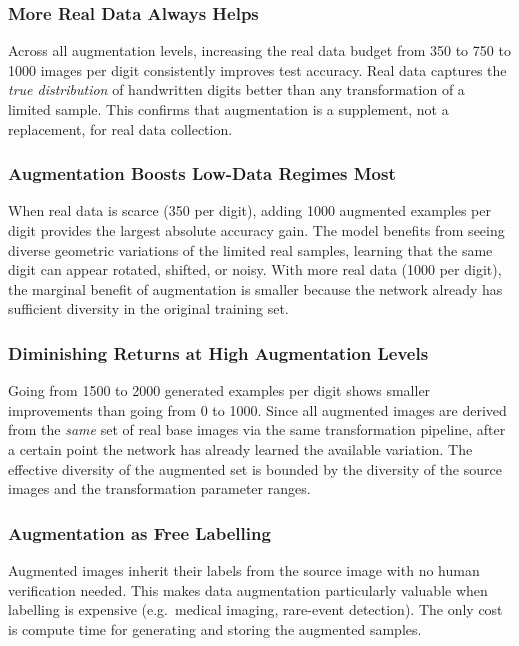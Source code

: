 \documentclass[12pt, a4paper]{article}
\begin{document}
\subsubsection{More Real Data Always Helps}

Across all augmentation levels, increasing the real data budget from 350 to 750 to
1000 images per digit consistently improves test accuracy. Real data captures the
\emph{true distribution} of handwritten digits better than any transformation of a
limited sample. This confirms that augmentation is a supplement, not a replacement,
for real data collection.

\subsubsection{Augmentation Boosts Low-Data Regimes Most}

When real data is scarce (350 per digit), adding 1000 augmented examples per digit
provides the largest absolute accuracy gain. The model benefits from seeing diverse
geometric variations of the limited real samples, learning that the same digit can
appear rotated, shifted, or noisy. With more real data (1000 per digit), the marginal
benefit of augmentation is smaller because the network already has sufficient diversity
in the original training set.

\subsubsection{Diminishing Returns at High Augmentation Levels}

Going from 1500 to 2000 generated examples per digit shows smaller improvements than
going from 0 to 1000. Since all augmented images are derived from the \emph{same} set
of real base images via the same transformation pipeline, after a certain point the
network has already learned the available variation. The effective diversity of the
augmented set is bounded by the diversity of the source images and the transformation
parameter ranges.

\subsubsection{Augmentation as Free Labelling}

Augmented images inherit their labels from the source image with no human verification
needed. This makes data augmentation particularly valuable when labelling is expensive
(e.g.\ medical imaging, rare-event detection). The only cost is compute time for
generating and storing the augmented samples.
\end{document}
